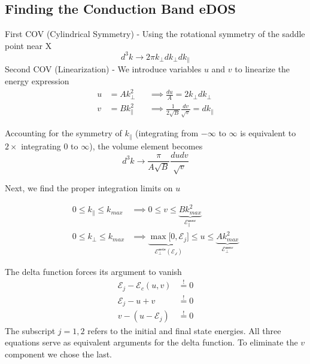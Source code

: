 \subsection{Finding the Conduction Band eDOS}
First COV (Cylindrical Symmetry) - Using the rotational symmetry of the saddle point near X
\begin{equation}
d^3k \to 2\pi k_{\perp} dk_{\perp} dk_{\parallel}
\label{eq:quadratic_intraband_cov1}
\end{equation}
Second COV (Linearization) - We introduce variables $u$ and $v$ to linearize the energy expression
\begin{align}
 u &= Ak_{\perp}^{2} &&\implies \frac{du}{A} = 2k_{\perp}dk_{\perp} \\
 v &= Bk_{\parallel}^{2} &&\implies \frac{1}{2\sqrt{ B }}\frac{dv}{\sqrt{ v }} = dk_{\parallel} 
\label{eq:quadratic_intraband_cov2}
\end{align}

Accounting for the symmetry of $k_{\parallel}$ (integrating from $-\infty$ to $\infty$ is equivalent to $2 \times$ integrating $0$ to $\infty$), the volume element becomes
\begin{equation}
d^3k \to \frac{\pi}{A\sqrt{ B }} \frac{du dv}{\sqrt{v}}
\label{eq:quadratic_intraband_volume_element}
\end{equation}

Next, we find the proper integration limits on $u$

\begin{align}
0\leq k_{\parallel}\leq k_{max} &\implies 0\leq v\leq \underbrace{ Bk_{max}^{2} }_{ \mathcal{E_{\parallel}^{max}} }\\
0\leq k_{\perp}\leq k_{max} &\implies \underbrace{ \max\Big[0,\mathcal{E}_{j}\Big] }_{ \mathcal{E_{\perp}^{min}}(\mathcal{E_{j}}) }\leq u \leq \underbrace{ Ak_{max}^{2} }_{ \mathcal{E_{\perp}^{max}} }
\label{eq:quadratic_intraband_integration_limits_u}
\end{align}

\begin{tcolorbox}[title={Note: $\mathbf{(b)\to(c)}$ transition}]
The delta function forces its argument to vanish
\begin{align}
\mathcal{E}_{j}-\mathcal{E}_{c}(u,v) &\stackrel{!}{=} 0 \\
\mathcal{E}_{j} -u + v&\stackrel{!}{=} 0 \\
v - (u-\mathcal{E}_{j})&\stackrel{!}{=} 0
\label{eq:quadratic_intraband_delta_argument}
\end{align}
The subscript $j=1, 2$ refers to the initial and final state energies. All three equations serve as equivalent arguments for the delta function. To eliminate the $v$ component we chose the last.
\end{tcolorbox}

